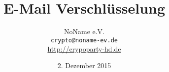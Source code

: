 \documentclass[mathserif]{beamer}
\title{E-Mail Verschlüsselung}
\author[NoName e.V.]{NoName e.V. \\ \small{\texttt{crypto@noname-ev.de} } \\ \small{\url{http://crypoparty-hd.de}} }
\date[02.12.15]{2. Dezember 2015}
\begin{document}
\titlepage
\rmfamily %
\tocframe




\blackframe
\end{document}
